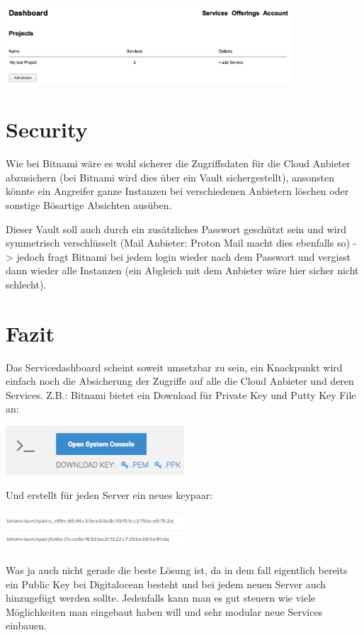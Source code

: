 \documentclass[11pt]{scrartcl}
\begin{document}
\includegraphics[width=0.8\textwidth]{account_projects.png}


\section{Security}
Wie bei Bitnami wäre es wohl sicherer die Zugriffsdaten für die Cloud Anbieter 
abzusichern (bei Bitnami wird dies über ein Vault sichergestellt), ansonsten 
könnte ein Angreifer ganze Instanzen bei verschiedenen Anbietern löschen oder 
sonstige Bösartige Absichten ausüben.

Dieser Vault soll auch durch ein zusätzliches Passwort geschützt sein und 
wird symmetrisch verschlüsselt (Mail Anbieter: Proton Mail macht dies ebenfalls 
so) -> jedoch fragt Bitnami bei jedem login wieder nach dem Passwort und 
vergisst dann wieder alle Instanzen (ein Abgleich mit dem Anbieter wäre hier sicher nicht 
schlecht).

\section{Fazit}
Das Servicedashboard scheint soweit umsetzbar zu sein, ein Knackpunkt wird 
einfach noch die Absicherung der Zugriffe auf alle die Cloud Anbieter und deren 
Services.
Z.B.: Bitnami bietet ein Download für Private Key und Putty Key File an:

\includegraphics[width=0.5\textwidth]{bitnami_private_key}

Und erstellt für jeden Server ein neues keypaar:

\includegraphics[width=0.5\textwidth]{bitnami_key}

Was ja auch nicht gerade die beste Lösung ist, da in dem fall eigentlich bereits 
ein Public Key bei Digitalocean besteht und bei jedem neuen Server auch 
hinzugefügt werden sollte.
Jedenfalls kann man es gut steuern wie viele Möglichkeiten man eingebaut haben 
will und sehr modular neue Services einbauen.
\end{document}
